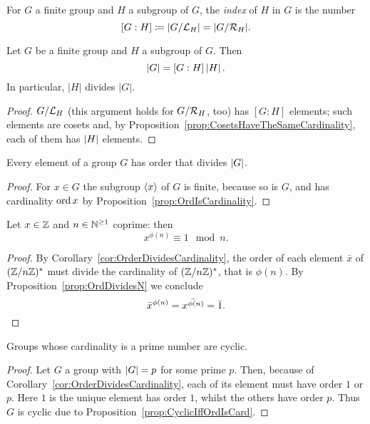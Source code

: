 \begin{definition}
For \(G\) a finite group and \(H\) a subgroup of \(G\), the {\em index} of \(H\) in \(G\) is the number
\[[G:H] \coloneq \lvert G/\mathcal L_H \rvert = \lvert G/\mathcal R_H \rvert.\]
\end{definition}

\begin{proposition}\label{prop:LagrangesTheorem}
Let \(G\) be a finite group and \(H\) a subgroup of \(G\). Then
\[\left\lvert G\right\rvert = [G:H] \left\lvert H\right\rvert .\]
In particular, \(\lvert H \rvert\) divides \(\lvert G \rvert\).
\end{proposition}

\begin{proof}
\(G/\mathcal L_H\) (this argument holds for \(G/\mathcal R_H\), too) has \([G:H]\) elements; such elements are cosets and, by Proposition~\ref{prop:CosetsHaveTheSameCardinality}, each of them has \(\left\lvert H\right\rvert\) elements.
\end{proof}

\begin{corollary}\label{cor:OrderDividesCardinality}
Every element of a group \(G\) has order that divides \(\left\lvert G\right\rvert\).
\end{corollary}

\begin{proof}
For \(x \in G\) the subgroup \(\left\langle x\right\rangle\) of \(G\) is finite, because so is \(G\), and has cardinality \(\operatorname{ord} x\) by Proposition~\ref{prop:OrdIsCardinality}.
\end{proof}

\begin{corollary}
Let \(x \in \mathbb Z\) and \(n \in \mathbb N^{\ge 1}\) coprime: then
\[x^{\phi(n)} \equiv 1 \mod n .\]
\end{corollary}

\begin{proof}
By Corollary~\ref{cor:OrderDividesCardinality}, the order of each element \(\bar x\) of \((\mathbb Z/n\mathbb Z)^*\) must divide the cardinality of \((\mathbb Z/n\mathbb Z)^*\), that is \(\phi(n)\). By Proposition~\ref{prop:OrdDividesN} we conclude
\[\bar x^{\phi(n)} = \bar{x^{\phi(n)}} = \bar 1 .\qedhere\]
\end{proof}

\begin{corollary}\label{cor:GroupsWithPrimeCardAreCyclic}
Groups whose cardinality is a prime number are cyclic.
\end{corollary}

\begin{proof}
Let \(G\) a group with \(\left\lvert G\right\rvert = p\) for some prime \(p\). Then, because of Corollary~\ref{cor:OrderDividesCardinality}, each of its element must have order \(1\) or \(p\). Here \(1\) is the unique element has order \(1\), whilst the others have order \(p\). Thus \(G\) is cyclic due to Proposition~\ref{prop:CyclicIffOrdIsCard}.
\end{proof}

